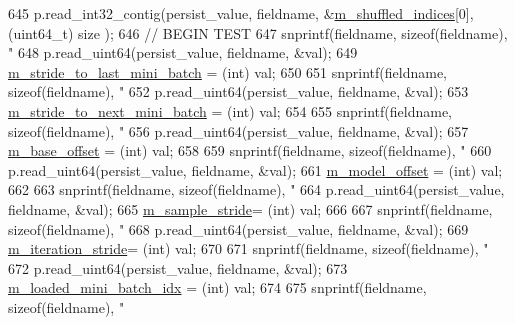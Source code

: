 \begin{DoxyCode}
{{{{{645     p.read\_int32\_contig(persist\_value, fieldname, &\hyperlink{classlbann_1_1generic__data__reader_aaab6aeff67ffff1c689336851fec2c57}{m\_shuffled\_indices}[0], (uint64\_t) size
      );
646     \textcolor{comment}{// BEGIN TEST }
647     snprintf(fieldname, \textcolor{keyword}{sizeof}(fieldname), \textcolor{stringliteral}{"%
648     p.read\_uint64(persist\_value, fieldname, &val);
649     \hyperlink{classlbann_1_1generic__data__reader_ac46922f2ef4f392bcc7c59c21685a3ff}{m\_stride\_to\_last\_mini\_batch} = (int) val;
650 
651     snprintf(fieldname, \textcolor{keyword}{sizeof}(fieldname), \textcolor{stringliteral}{"%
652     p.read\_uint64(persist\_value, fieldname, &val);
653     \hyperlink{classlbann_1_1generic__data__reader_a02c4632cc7cad5c3e4062934c41717a0}{m\_stride\_to\_next\_mini\_batch} = (int) val;
654 
655     snprintf(fieldname, \textcolor{keyword}{sizeof}(fieldname), \textcolor{stringliteral}{"%
656     p.read\_uint64(persist\_value, fieldname, &val);
657     \hyperlink{classlbann_1_1generic__data__reader_a77946c4dca753c23f39e9a490eba1229}{m\_base\_offset} = (int) val;
658 
659     snprintf(fieldname, \textcolor{keyword}{sizeof}(fieldname), \textcolor{stringliteral}{"%
660     p.read\_uint64(persist\_value, fieldname, &val);
661     \hyperlink{classlbann_1_1generic__data__reader_a5d9a0efd1ebe43a74911c35ffe84edc9}{m\_model\_offset} = (int) val;
662 
663     snprintf(fieldname, \textcolor{keyword}{sizeof}(fieldname), \textcolor{stringliteral}{"%
664     p.read\_uint64(persist\_value, fieldname, &val);
665     \hyperlink{classlbann_1_1generic__data__reader_a58461c39de7e17eafc5b98aec99cbb9b}{m\_sample\_stride}= (int) val;
666 
667     snprintf(fieldname, \textcolor{keyword}{sizeof}(fieldname), \textcolor{stringliteral}{"%
668     p.read\_uint64(persist\_value, fieldname, &val);
669     \hyperlink{classlbann_1_1generic__data__reader_a73b23a2e7768db4e9e8ba4d9a362163a}{m\_iteration\_stride}= (int) val;
670 
671     snprintf(fieldname, \textcolor{keyword}{sizeof}(fieldname), \textcolor{stringliteral}{"%
672     p.read\_uint64(persist\_value, fieldname, &val);
673     \hyperlink{classlbann_1_1generic__data__reader_a2cfc5a3e6de8a8a24d3525ec3ed586fb}{m\_loaded\_mini\_batch\_idx} = (int) val;
674 
675     snprintf(fieldname, \textcolor{keyword}{sizeof}(fieldname), \textcolor{stringliteral}{"%
}}}}}}}}}}}}}
\end{DoxyCode}

